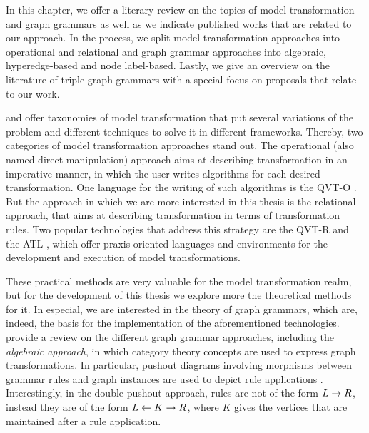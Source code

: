 
In this chapter, we offer a literary review on the topics of model transformation and graph grammars as well as we indicate published works that are related to our approach. In the process, we split model transformation approaches into operational and relational and graph grammar approaches into algebraic, hyperedge-based and node label-based. Lastly, we give an overview on the literature of triple graph grammars with a special focus on proposals that relate to our work.

\citep{mens2006taxonomy} and \citep{czarnecki2003classification} offer taxonomies of model transformation that put several variations of the problem and different techniques to solve it in different frameworks. Thereby, two categories of model transformation approaches stand out. The operational (also named direct-manipulation) approach aims at describing transformation in an imperative manner, in which the user writes algorithms for each desired transformation. One language for the writing of such algorithms is the QVT-O \cite{omg2008meta}. But the approach in which we are more interested in this thesis is the relational approach, that aims at describing transformation in terms of transformation rules. Two popular technologies that address this strategy are the QVT-R \cite{omg2008meta} and the ATL \cite{jouault2006atl}, which offer praxis-oriented languages and environments for the development and execution of model transformations.

These practical methods are very valuable for the model transformation realm, but for the development of this thesis we explore more the theoretical methods for it. In especial, we are interested in the theory of graph grammars, which are, indeed, the basis for the implementation of the aforementioned technologies. \citep{ehrig1999handbook} provide a review on the different graph grammar approaches, including the \emph{algebraic approach}, in which category theory concepts are used to express graph transformations. In particular, pushout diagrams involving morphisms between grammar rules and graph instances are used to depict rule applications \cite{corradini1997algebraic}. Interestingly, in the double pushout approach, rules are not of the form $L \to R$, instead they are of the form $L \leftarrow K \to R$, where $K$ gives the vertices that are maintained after a rule application.

